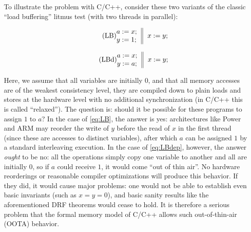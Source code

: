 To illustrate the problem with C/C++, consider these two variants of the
classic ``load buffering'' litmus test (with two threads in parallel):
\begin{center}
\begin{minipage}{.46\columnwidth}
\begin{equation}\label{eq:LB}\tag{LB}
\inarrII{ a:=x; \\ y:=1; }{ x:=y; }\!\!\!
\end{equation}
\end{minipage}
\hfill
\begin{minipage}{.46\columnwidth}
\begin{equation}\label{eq:LBdep}\tag{LBd}
\inarrII{ a:=x; \\ y:=a; }{ x:=y; }
\end{equation}
\end{minipage}
\end{center}
Here, we assume that all variables are initially $0$, and that all
memory accesses are of the weakest consistency level, \ie they are
compiled down to plain loads and stores at the hardware level with no
additional synchronization (in C/C++ this is called ``relaxed'').  The
question is: should it be possible for these programs to assign $1$ to
$a$?  In the case of \ref{eq:LB}, the answer is yes: architectures
like Power and ARM may reorder the write of $y$ before the read of $x$
in the first thread (since these are accesses to distinct variables),
after which $a$ can be assigned $1$ by a standard interleaving
execution. In the case of \ref{eq:LBdep}, however, the answer
\emph{ought} to be no: all the operations simply copy one variable to
another and all are initially $0$, so if $a$ could receive $1$, it
would come ``out of thin air''.  No hardware reorderings or reasonable
compiler optimizations will produce this behavior.  If they did, it
would cause major problems: one would not be able to establish even
basic invariants (such as $x = y = 0$), and basic sanity results like
the aforementioned DRF theorems would cease to hold.  It is therefore
a serious problem that the formal memory model of C/C++ allows such
out-of-thin-air (OOTA) behavior.

